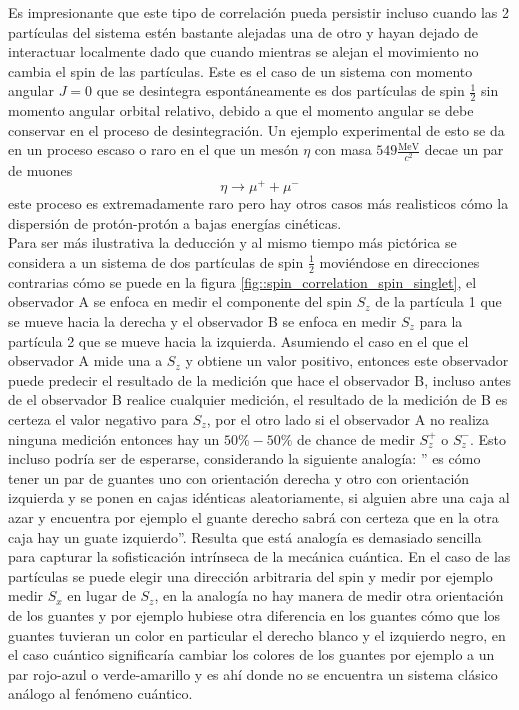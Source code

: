 \documentclass[a4paper]{article}
\begin{document}
Es impresionante que este tipo de correlación pueda persistir incluso cuando las 2 partículas del sistema estén bastante alejadas una de otro y hayan dejado de interactuar localmente dado que cuando mientras se alejan el movimiento no cambia el spin de las partículas. Este es el caso de un sistema con momento angular $J=0$ que se desintegra espontáneamente es dos partículas de spin $\frac{1}{2}$ sin momento angular orbital relativo, debido a que el momento angular se debe conservar en el proceso de desintegración. Un ejemplo experimental de esto se da en un proceso escaso o raro en el que un mesón $\eta$ con masa $549\frac{\text{MeV}}{c^2}$ decae un par de muones
\begin{equation}
\eta\rightarrow\mu^+ + \mu^-
\end{equation}
este proceso es extremadamente raro pero hay otros casos más realisticos cómo la dispersión de protón-protón a bajas energías cinéticas. \\
Para ser más ilustrativa la deducción y al mismo tiempo más pictórica se considera a un sistema de dos partículas de spin $\frac{1}{2}$ moviéndose en direcciones contrarias cómo se puede en la figura \ref{fig::spin_correlation_spin_singlet}, el observador A se enfoca en medir el componente del spin $S_z$ de la partícula 1 que se mueve hacia la derecha y el observador B se enfoca en medir $S_z$ para la partícula 2 que se mueve hacia la izquierda. Asumiendo el caso en el que el observador A mide una a $S_z$ y obtiene un valor positivo, entonces este observador puede predecir el resultado de la medición que hace el observador B, incluso antes de el observador B realice cualquier medición, el resultado de la medición de B es certeza el valor negativo para $S_z$, por el otro lado si el observador A no realiza ninguna medición entonces hay un $50\%-50\%$ de chance de medir $S_z^+$ o $S_z^-$. Esto incluso podría ser de esperarse, considerando la siguiente analogía: '' es cómo tener un par de guantes uno con orientación derecha y otro con orientación izquierda y se ponen en cajas idénticas aleatoriamente, si alguien abre una caja al azar y encuentra por ejemplo el guante derecho sabrá con certeza que en la otra caja hay un guate izquierdo''. Resulta que está analogía es demasiado sencilla para capturar la sofisticación intrínseca de la mecánica cuántica. En el caso de las partículas se puede elegir una dirección arbitraria del spin y medir por ejemplo medir $S_x$ en lugar de $S_z$, en la analogía no hay manera de medir otra orientación de los guantes y por ejemplo hubiese otra diferencia en los guantes cómo que los guantes tuvieran un color en particular el derecho blanco y el izquierdo negro, en el caso cuántico significaría cambiar los colores de los guantes por ejemplo a un par rojo-azul o verde-amarillo y es ahí donde no se encuentra un sistema clásico análogo al fenómeno cuántico.\\
\end{document}
